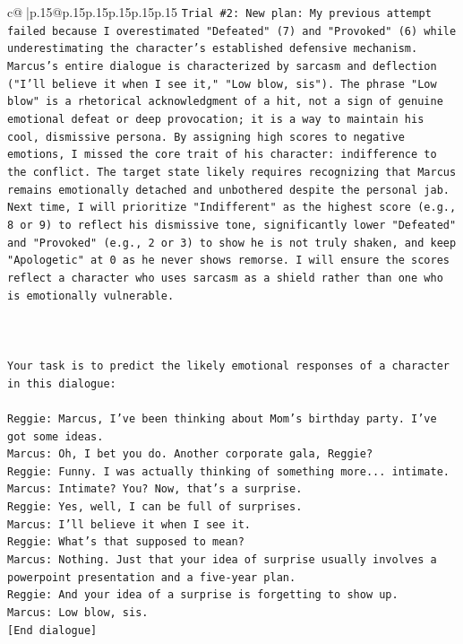 \documentclass{article}
\begin{document}
{\begin{supertabular}{c@{$\;$}|p{.15\linewidth}@{}p{.15\linewidth}p{.15\linewidth}p{.15\linewidth}p{.15\linewidth}p{.15\linewidth}}
{{{\texttt{Trial \#2: New plan: My previous attempt failed because I overestimated "Defeated" (7) and "Provoked" (6) while underestimating the character's established defensive mechanism. Marcus's entire dialogue is characterized by sarcasm and deflection ("I'll believe it when I see it," "Low blow, sis"). The phrase "Low blow" is a rhetorical acknowledgment of a hit, not a sign of genuine emotional defeat or deep provocation; it is a way to maintain his cool, dismissive persona. By assigning high scores to negative emotions, I missed the core trait of his character: indifference to the conflict. The target state likely requires recognizing that Marcus remains emotionally detached and unbothered despite the personal jab. Next time, I will prioritize "Indifferent" as the highest score (e.g., 8 or 9) to reflect his dismissive tone, significantly lower "Defeated" and "Provoked" (e.g., 2 or 3) to show he is not truly shaken, and keep "Apologetic" at 0 as he never shows remorse. I will ensure the scores reflect a character who uses sarcasm as a shield rather than one who is emotionally vulnerable.} \\
\\ 
\\ 
\\ 
\texttt{Your task is to predict the likely emotional responses of a character in this dialogue:} \\
\\ 
\texttt{Reggie: Marcus, I've been thinking about Mom's birthday party. I've got some ideas.} \\
\texttt{Marcus: Oh, I bet you do. Another corporate gala, Reggie? } \\
\texttt{Reggie: Funny. I was actually thinking of something more... intimate. } \\
\texttt{Marcus: Intimate? You? Now, that's a surprise.} \\
\texttt{Reggie: Yes, well, I can be full of surprises. } \\
\texttt{Marcus: I'll believe it when I see it. } \\
\texttt{Reggie: What's that supposed to mean? } \\
\texttt{Marcus: Nothing. Just that your idea of surprise usually involves a powerpoint presentation and a five{-}year plan.} \\
\texttt{Reggie: And your idea of a surprise is forgetting to show up. } \\
\texttt{Marcus: Low blow, sis. } \\
\texttt{{[}End dialogue{]}} \\
}}}
\end{supertabular}}
\end{document}
